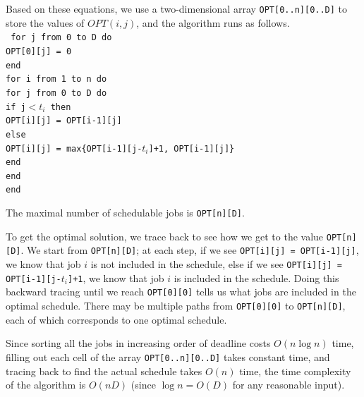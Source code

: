 \documentclass[12pt,letterpaper]{article}
\begin{document}
Based on these equations, we use a two-dimensional array \texttt{OPT[0..n][0..D]} to store the values of $OPT(i,j)$, and the algorithm runs as follows.
\\
\tt
for j from 0 to D do\\
\mbox{\hspace{2em}}OPT[0][j] = 0\\
end\\
for i from 1 to n do\\
\mbox{\hspace{2em}}for j from 0 to D do\\
\mbox{\hspace{4em}}if j$ < t_i$ then\\
\mbox{\hspace{6em}}OPT[i][j] = OPT[i-1][j]\\
\mbox{\hspace{4em}}else\\
\mbox{\hspace{6em}}OPT[i][j] = max\{OPT[i-1][j-$t_i$]+1, OPT[i-1][j]\}\\
\mbox{\hspace{4em}}end\\
\mbox{\hspace{2em}}end\\
end\\
\rm

The maximal number of schedulable jobs is \texttt{OPT[n][D]}.

To get the optimal solution, we trace back to see how we get to the value \texttt{OPT[n][D]}. We start from \texttt{OPT[n][D]}; at each step, if we see \texttt{OPT[i][j] = OPT[i-1][j]}, we know that job $i$ is not included in the schedule, else if we see \texttt{OPT[i][j] = OPT[i-1][j-$t_i$]+1}, we know that job $i$ is included in the schedule. Doing this backward tracing until we reach \texttt{OPT[0][0]} tells us what jobs are included in the optimal schedule. There may be multiple paths from \texttt{OPT[0][0]} to \texttt{OPT[n][D]}, each of which corresponds to one optimal schedule.

Since sorting all the jobs in increasing order of deadline costs $O(n\log n)$ time, filling out each cell of the array \texttt{OPT[0..n][0..D]} takes constant time, and tracing back to find the actual schedule takes $O(n)$ time, the time complexity of the algorithm is $O(nD)$ (since $\log n = O(D)$ for any reasonable input).
\end{document}
